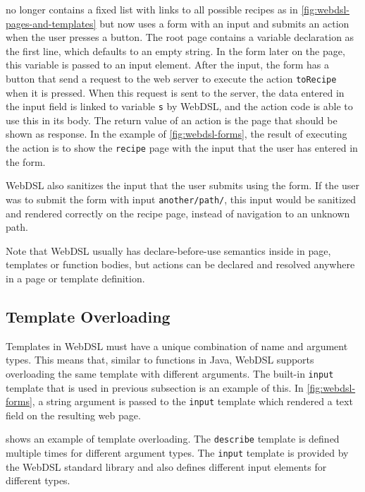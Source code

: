        no longer contains a fixed list with links to all possible recipes as in \cref{fig:webdsl-pages-and-templates} but now uses a form with an input and submits an action when the user presses a button. The root page contains a variable declaration as the first line, which defaults to an empty string. In the form later on the page, this variable is passed to an input element. After the input, the form has a button that send a request to the web server to execute the action \texttt{toRecipe} when it is pressed. When this request is sent to the server, the data entered in the input field is linked to variable \texttt{s} by WebDSL, and the action code is able to use this in its body. The return value of an action is the page that should be shown as response. In the example of \cref{fig:webdsl-forms}, the result of executing the action is to show the \texttt{recipe} page with the input that the user has entered in the form.

      WebDSL also sanitizes the input that the user submits using the form. If the user was to submit the form with input \texttt{another/path/}, this input would be sanitized and rendered correctly on the recipe page, instead of navigation to an unknown path.

      Note that WebDSL usually has declare-before-use semantics inside in page, templates or function bodies, but actions can be declared and resolved anywhere in a page or template definition.

    \subsection{\label{subsec:template-overloading}Template Overloading}

      Templates in WebDSL must have a unique combination of name and argument types. This means that, similar to functions in Java, WebDSL supports overloading the same template with different arguments. The built-in \texttt{input} template that is used in previous subsection is an example of this. In \cref{fig:webdsl-forms}, a string argument is passed to the \texttt{input} template which rendered a text field on the resulting web page.

       shows an example of template overloading. The \texttt{describe} template is defined multiple times for different argument types. The \texttt{input} template is provided by the WebDSL standard library and also defines different input elements for different types.

